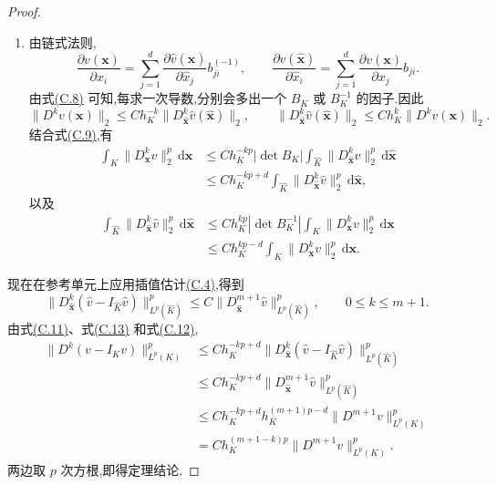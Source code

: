 \begin{proof}
\begin{enumerate}[label=(\roman*)]
\item 由链式法则,
\[
 \frac{\partial v(\bm x)}{\partial x_i}
 =\sum_{j=1}^d\frac{\partial\widehat v(\widehat{\bm x})}
 {\partial\widehat x_j}b_{ji}^{(-1)},\qquad
 \frac{\partial\widehat v(\widehat{\bm x})}{\partial\widehat x_i}
 =\sum_{j=1}^d\frac{\partial v(\bm x)}{\partial x_j}b_{ji}.
\]
由式\hyperref[eq:appendix-c-8]{(C.8)} 可知,每求一次导数,分别会多出一个 $B_K$ 或 $B_K^{-1}$ 的因子.因此
\[
 \|D^k v(\bm x)\|_2
 \le Ch_K^{-k}\|D^k_{\widehat{\bm x}}\widehat v(\widehat{\bm x})\|_2,
 \qquad
 \|D^k_{\widehat{\bm x}}\widehat v(\widehat{\bm x})\|_2
 \le Ch_K^k\|D^k v(\bm x)\|_2.
\]
结合式\hyperref[eq:appendix-c-9]{(C.9)},有
\begin{equation}\label{eq:appendix-c-11}
\begin{aligned}
 \int_K\|D^k_{\bm x}v\|_2^p\,\mathrm d\bm x
 &\le Ch_K^{-kp}|\det B_K|
       \int_{\widehat K}\|D^k_{\widehat{\bm x}}\widehat v\|_2^p
       \,\mathrm d\widehat{\bm x}\\
 &\le Ch_K^{-kp+d}
       \int_{\widehat K}\|D^k_{\widehat{\bm x}}\widehat v\|_2^p
       \,\mathrm d\widehat{\bm x},
\end{aligned}
\end{equation}
以及
\begin{equation}\label{eq:appendix-c-12}
\begin{aligned}
 \int_{\widehat K}\|D^k_{\widehat{\bm x}}\widehat v\|_2^p
       \,\mathrm d\widehat{\bm x}
 &\le Ch_K^{kp}|\det B_K^{-1}|
       \int_K\|D^k_{\bm x}v\|_2^p\,\mathrm d\bm x\\
 &\le Ch_K^{kp-d}
       \int_K\|D^k_{\bm x}v\|_2^p\,\mathrm d\bm x.
\end{aligned}
\end{equation}
\end{enumerate}

现在在参考单元上应用插值估计\hyperref[eq:appendix-c-4]{(C.4)},得到
\begin{equation}\label{eq:appendix-c-13}
 \|D^k_{\widehat{\bm x}}
    (\widehat v-I_{\widehat K}\widehat v)\|_{L^p(\widehat K)}^p
 \le C\|D^{m+1}_{\widehat{\bm x}}\widehat v\|_{L^p(\widehat K)}^p,
 \qquad 0\le k\le m+1.
\end{equation}
由式\hyperref[eq:appendix-c-11]{(C.11)}、式\hyperref[eq:appendix-c-13]{(C.13)} 和式\hyperref[eq:appendix-c-12]{(C.12)},
\[
\begin{aligned}
 \|D^k(v-I_Kv)\|_{L^p(K)}^p
 &\le Ch_K^{-kp+d}
  \|D^k_{\widehat{\bm x}}
     (\widehat v-I_{\widehat K}\widehat v)\|_{L^p(\widehat K)}^p\\
 &\le Ch_K^{-kp+d}
  \|D^{m+1}_{\widehat{\bm x}}\widehat v\|_{L^p(\widehat K)}^p\\
 &\le Ch_K^{-kp+d}h_K^{(m+1)p-d}
  \|D^{m+1}v\|_{L^p(K)}^p\\
 &=Ch_K^{(m+1-k)p}\|D^{m+1}v\|_{L^p(K)}^p.
\end{aligned}
\]
两边取 $p$ 次方根,即得定理结论.
\end{proof}

